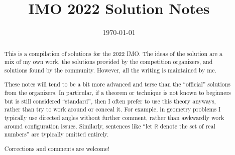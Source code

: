 \documentclass[11pt]{scrartcl}
\title{IMO 2022 Solution Notes}
\date{\today}
\begin{document}
\maketitle

\begin{abstract}
This is a compilation of solutions
for the 2022 IMO.
The ideas of the solution are a mix of my own work,
the solutions provided by the competition organizers,
and solutions found by the community.
However, all the writing is maintained by me.

These notes will tend to be a bit more advanced and terse than the ``official''
solutions from the organizers.
In particular, if a theorem or technique is not known to beginners
but is still considered ``standard'', then I often prefer to
use this theory anyways, rather than try to work around or conceal it.
For example, in geometry problems I typically use directed angles
without further comment, rather than awkwardly work around configuration issues.
Similarly, sentences like ``let $\mathbb{R}$ denote the set of real numbers''
are typically omitted entirely.

Corrections and comments are welcome!
\end{abstract}

\tableofcontents
\newpage

\addtocounter{section}{-1}
\end{document}
